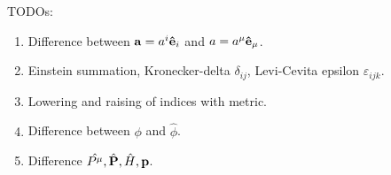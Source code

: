 TODOs:
\begin{enumerate}
	\item Difference between $\vb{a}=a^i\vu{e}_i$ and $a=a^\mu\vu{e}_\mu$.
	\item Einstein summation, Kronecker-delta $\delta_{ij}$, Levi-Cevita epsilon $\varepsilon_{ijk}$.
	\item Lowering and raising of indices with metric.
	\item Difference between $\phi$ and $\hat\phi$.
	\item Difference $\hat{P^\mu},\hat{\vb{P}},\hat{H},\vb{p}$.
\end{enumerate}

